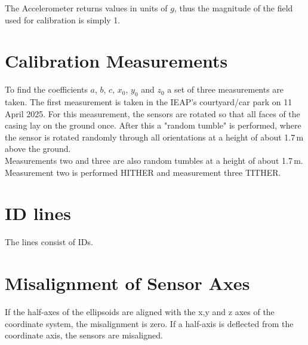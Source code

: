 The Accelerometer returns values in units of $g$, thus the magnitude of the field used for calibration is simply 1.

\section{Calibration Measurements \label{sec:da:calibration_meas}}
To find the coefficients $a$, $b$, $c$, $x_0$, $y_0$ and $z_0$ a set of three measurements are taken. The first measurement is taken in the \ac{IEAP}'s courtyard/car park on 11 April 2025. For this measurement, the sensors are rotated so that all faces of the casing lay on the ground once. After this a "random tumble" is performed, where the sensor is rotated randomly through all orientations at a height of about 1.7\,m above the ground.\\
Measurements two and three are also random tumbles at a height of about 1.7\,m. Measurement two is performed HITHER and measurement three TITHER.

\section{ID lines \label{sec:da:id_lines}}
The lines consist of IDs.

\section{Misalignment of Sensor Axes \label{sec:da:misalignment}}
If the half-axes of the ellipsoids are aligned with the x,y and z axes of the coordinate system, the misalignment is zero. If a half-axis is deflected from the coordinate axis, the sensors are misaligned.